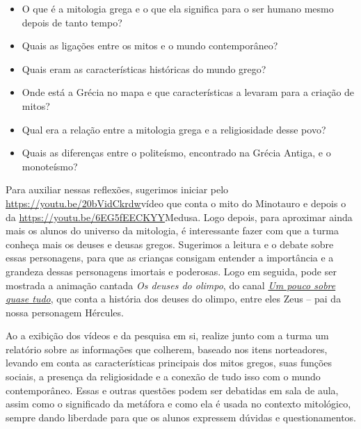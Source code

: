\documentclass[11pt]{extarticle}
\begin{document}
\begin{itemize}
\item O que é a mitologia grega e o que ela significa para o ser humano mesmo depois de tanto tempo?
\item Quais as ligações entre os mitos e o mundo contemporâneo?
\item Quais eram as características históricas do mundo grego?
\item Onde está a Grécia no mapa e que características a levaram para a criação de mitos?
\item Qual era a relação entre a mitologia grega e a religiosidade desse povo?
\item Quais as diferenças entre o politeísmo, encontrado na Grécia Antiga, e o monoteísmo? %
\end{itemize}



Para auxiliar nessas reflexões, sugerimos iniciar pelo \url{https://youtu.be/20bVidCkrdw}{vídeo que conta o mito do Minotauro} e depois o da \url{https://youtu.be/6EG5fEECKYY}{Medusa}. Logo depois, para aproximar ainda mais os alunos do universo da mitologia, é interessante fazer com que a turma conheça mais os deuses e deusas gregos. Sugerimos a leitura e o debate sobre essas personagens, para que as crianças consigam entender a importância e a grandeza dessas personagens imortais e poderosas. Logo em seguida, pode ser mostrada a animação cantada \textit{Os deuses do olimpo}, do canal \href{https://youtu.be/DJ-5cxJVI64}{\textit{Um pouco sobre quase tudo}}, que conta a história dos deuses do olimpo, entre eles Zeus -- pai da nossa personagem Hércules. 


Ao a exibição dos vídeos e da pesquisa em si, realize junto com a turma um relatório sobre as informações que colherem, baseado nos itens norteadores, levando em conta as características principais dos mitos gregos, suas funções sociais, a presença da religiosidade e a conexão de tudo isso com o mundo contemporâneo. Essas e outras questões podem ser debatidas em sala de aula, assim como o significado da metáfora e como ela é usada no contexto mitológico, sempre dando liberdade para que os alunos expressem dúvidas e questionamentos.
\end{document}
